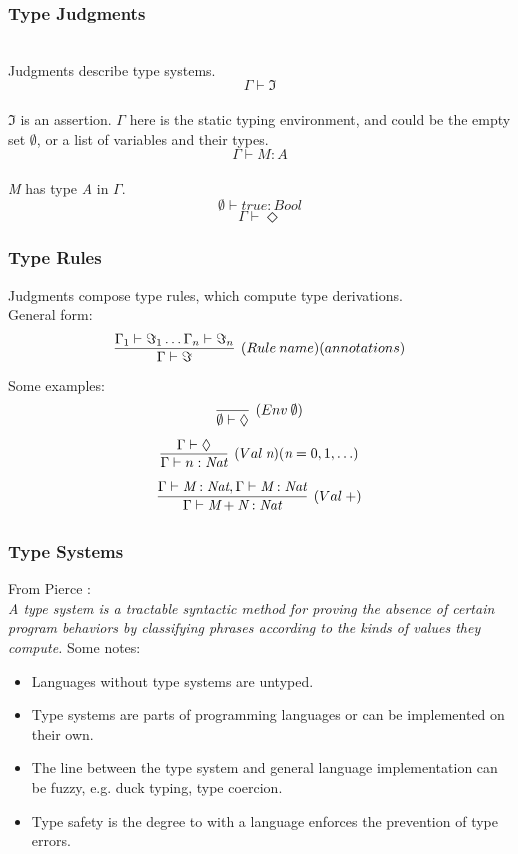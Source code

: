 \documentclass{beamer}
\newcommand{\G}{\Gamma}
\newcommand{\entails}{\vdash}
\begin{document}
\begin{frame}
  \frametitle{Type Judgments}
  \\
  \vspace{20pt}
  Judgments describe type systems.\\
  \[ \G \entails \Im \]\\
  $\Im$ is an assertion. $\Gamma$ here is the static typing environment, and
  could be the empty set $\emptyset$, or a list of variables and their types.\\
  \[ \G \entails \textit{M} : \textit{A} \]\\
  \textit{M} has type \textit{A} in $\Gamma$.\\
  \[ \emptyset \entails \textit{true} : \textit{Bool} \]
  \[ \G \entails \Diamond \]
\end{frame}

\begin{frame}
  \frametitle{Type Rules}
  \vspace{20pt}
  Judgments compose type rules, which compute type derivations.\\
  \vspace{10pt}
  General form:
  \[ \infer[(Rule\:name)(annotations)]{\Gamma \entails \Im}{\Gamma_1 \entails \Im_1
      \ldots \Gamma_n \entails \Im_n} \]
  Some examples:
  \vspace{2pt}
  \[ \infer[(Env\:\emptyset)]{\emptyset \entails \Diamond}{} \]
  \vspace{2pt}
  \[ \infer[(Val\:\textit{n})(\textit{n} = 0,1,\ldots)]{\G \entails n :
      \textit{Nat}}{\G \entails \Diamond} \]
  \vspace{2pt}
  \[ \infer[(Val\:+)]{\G \entails \textit{M} + \textit{N} : \textit{Nat}}{\G
      \entails \textit{M} : \textit{Nat}, \G \entails \textit{M} : \textit{Nat}} \]
\end{frame}

\begin{frame}
  \frametitle{Type Systems}
  From Pierce \cite{TAPL}:\\
  \textit{A type system is a tractable syntactic method for proving the absence
    of certain program behaviors by classifying phrases according to the kinds
    of values they compute.}
  \vspace{20pt}
  Some notes:\\
  \begin{itemize}
    \item Languages without type systems are untyped.
    \item Type systems are parts of programming languages or can be implemented
      on their own.
    \item The line between the type system and general language implementation
      can be fuzzy, e.g. duck typing, type coercion.
    \item Type safety is the degree to with a language enforces the prevention
      of type errors.
  \end{itemize}
\end{frame}
\end{document}
